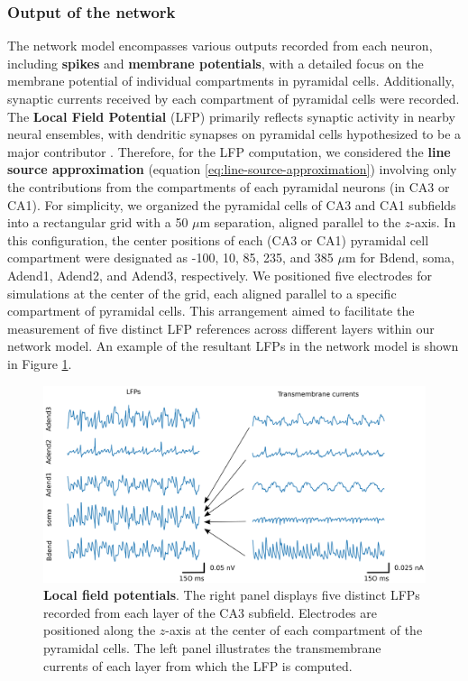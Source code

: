 \documentclass[../main.tex]{subfiles}
\begin{document}
\subsubsection{Output of the network}
The network model encompasses various outputs recorded from each neuron, including \textbf{spikes} and \textbf{membrane potentials}, with a detailed focus on the membrane potential of individual compartments in pyramidal cells.
Additionally, synaptic currents received by each compartment of pyramidal cells were recorded.
The \textbf{Local Field Potential} (LFP) primarily reflects synaptic activity in nearby neural ensembles, with dendritic synapses on pyramidal cells hypothesized to be a major contributor \citep{linden011859,https://doi.org/10.1113/JP279452}.
Therefore, for the LFP computation, we considered the \textbf{line source approximation} (equation \eqref{eq:line-source-approximation}) involving only the contributions from the compartments of each pyramidal neurons (in CA3 or CA1).
For simplicity, we organized the pyramidal cells of CA3 and CA1 subfields into a rectangular grid with a 50 $\mu$m separation, aligned parallel to the $z$-axis.
In this configuration, the center positions of each (CA3 or CA1) pyramidal cell compartment were designated as -100, 10, 85, 235, and 385 $\mu$m for Bdend, soma, Adend1, Adend2, and Adend3, respectively.
We positioned five electrodes for simulations at the center of the grid, each aligned parallel to a specific compartment of pyramidal cells.
This arrangement aimed to facilitate the measurement of five distinct LFP references across different layers within our network model.
An example of the resultant LFPs in the network model is shown in Figure \ref{fig:LFP-example}.
\begin{figure}[!htb]
    \centering
    \includegraphics[width=\textwidth]{chapter4/figures/LFPs.png}
    \caption{\textbf{Local field potentials}. 
    The right panel displays five distinct LFPs recorded from each layer of the CA3 subfield.
    Electrodes are positioned along the $z$-axis at the center of each compartment of the pyramidal cells.
    The left panel illustrates the transmembrane currents of each layer from which the LFP is computed.}
    \label{fig:LFP-example}
\end{figure}
\end{document}
